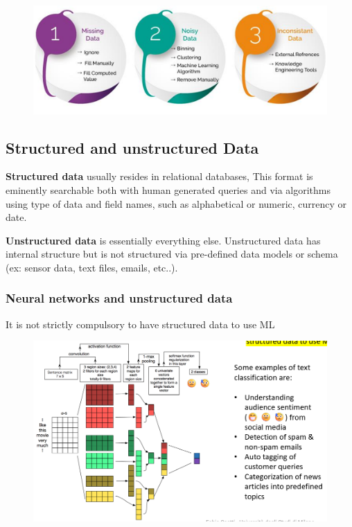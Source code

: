 \begin{figure}[H]
    \centering
    \includegraphics[width=0.8\linewidth]{07-08/images/data missing.png}
\end{figure}

\subsection{Structured and unstructured Data }
\noindent \textbf{Structured data} usually resides in relational databases, This format is eminently searchable both with human generated queries and via algorithms using type of data and field names, such as alphabetical or numeric, currency or date.

\noindent \textbf{Unstructured data} is essentially everything else. Unstructured data has internal structure but is not structured via pre-defined data models or schema (ex: sensor data, text files, emails, etc..).

\subsubsection{Neural networks and unstructured data}
\noindent It is not strictly compulsory to have structured data to use ML 

\begin{figure}[H]
    \centering
    \includegraphics[width=0.8\linewidth]{07-08/images/unstructured data.png}
\end{figure}



